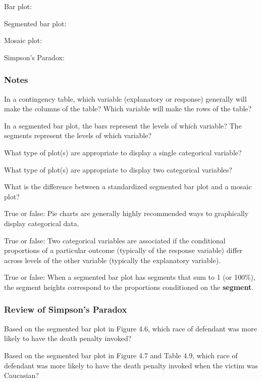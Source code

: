 \documentclass[
]{report}
\newcommand{\rgs}{\vspace{12pt}} %
\begin{document}
Bar plot:
\rgs

Segmented bar plot:
\rgs

Mosaic plot:
\rgs

Simpson's Paradox:
\rgs

\hypertarget{notes-4}{%
\subsubsection*{Notes}\label{notes-4}}

In a contingency table, which variable (explanatory or response) generally will make the columns of the table? Which variable will make the rows of the table?
\rgs

In a segmented bar plot, the bars represent the levels of which variable? The segments represent the levels of which variable?
\rgs

What type of plot(s) are appropriate to display a single categorical variable?
\rgs

What type of plot(s) are appropriate to display two categorical variables?
\rgs

What is the difference between a standardized segmented bar plot and a mosaic plot?
\rgs

True or false: Pie charts are generally highly recommended ways to graphically display categorical data.

True or false: Two categorical variables are associated if the conditional proportions of a particular outcome (typically of the response variable) differ across levels of the other variable (typically the explanatory variable).

True or false: When a segmented bar plot has segments that sum to 1 (or 100\%), the segment heights correspond to the proportions conditioned on the \textbf{segment}.

\hypertarget{review-of-simpsons-paradox}{%
\subsubsection*{Review of Simpson's Paradox}\label{review-of-simpsons-paradox}}

Based on the segmented bar plot in Figure 4.6, which race of defendant was more likely to have the death penalty invoked?
\rgs

Based on the segmented bar plot in Figure 4.7 and Table 4.9, which race of defendant was more likely to have the death penalty invoked when the victim was Caucasian?
\rgs
\end{document}

